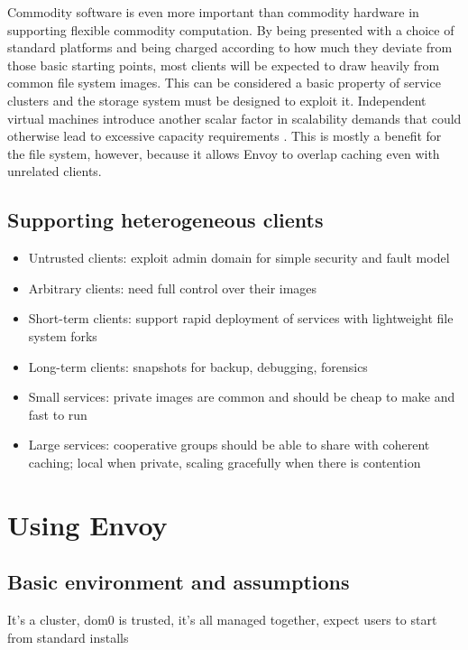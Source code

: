 Commodity software is even more important than commodity hardware in supporting flexible commodity computation. By being presented with a choice of standard platforms and being charged according to how much they deviate from those basic starting points, most clients will be expected to draw heavily from common file system images. This can be considered a basic property of service clusters and the storage system must be designed to exploit it. Independent virtual machines introduce another scalar factor in scalability demands that could otherwise lead to excessive capacity requirements \cite{warfield}. This is mostly a benefit for the file system, however, because it allows Envoy to overlap caching even with unrelated clients.

\subsection{Supporting heterogeneous clients}



\begin{itemize}
\item Untrusted clients: exploit admin domain for simple security and fault model
\item Arbitrary clients: need full control over their images
\item Short-term clients: support rapid deployment of services with lightweight file system forks
\item Long-term clients: snapshots for backup, debugging, forensics
\item Small services: private images are common and should be cheap to make and fast to run
\item Large services: cooperative groups should be able to share with coherent caching; local when private, scaling gracefully when there is contention
\end{itemize}

\section{Using Envoy}

\subsection{Basic environment and assumptions}



It's a cluster, dom0 is trusted, it's all managed together, expect users to start from standard installs

